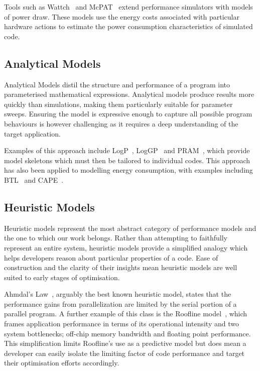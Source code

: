 Tools such as Wattch~\cite{brooks:2000aa} and McPAT~\cite{li:2009aa} extend performance simulators with models of power draw.
These models use the energy costs associated with particular hardware actions to estimate the power consumption characteristics of simulated code.

\subsection{Analytical Models} 
Analytical Models distil the structure and performance of a program into parameterised mathematical expressions.
Analytical models produce results more quickly than simulations, making them particularly suitable for parameter sweeps.
Ensuring the model is expressive enough to capture all possible program behaviours is however challenging as it requires a deep understanding of the target application.

Examples of this approach include LogP~\cite{culler:1993aa}, LogGP~\cite{alexandrov:1997aa} and PRAM~\cite{karp:1991aa}, which provide model skeletons which must then be tailored to individual codes.
This approach has also been applied to modelling energy consumption, with examples including BTL~\cite{manousakis:2012aa} and CAPE~\cite{kamble:1997aa}.

\subsection{Heuristic Models}
Heuristic models represent the most abstract category of performance models and the one to which our work belongs.
Rather than attempting to faithfully represent an entire system, heuristic models provide a simplified analogy which helps developers reason about particular properties of a code.
Ease of construction and the clarity of their insights mean heuristic models are well suited to early stages of optimisation.

Ahmdal's Law~\cite{amdahl:1967aa}, arguably the best known heuristic model, states that the performance gains from parallelization are limited by the serial portion of a parallel program.
A further example of this class is the Roofline model~\cite{williams:2009aa}, which frames application performance in terms of its operational intensity and two system bottlenecks; off-chip memory bandwidth and floating point performance.
This simplification limits Roofline's use as a predictive model but does mean a developer can easily isolate the limiting factor of code performance and target their optimisation efforts accordingly.

